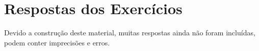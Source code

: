 
\chapter*{Respostas dos Exercícios}

Devido a construção deste material, muitas respostas ainda não foram incluídas, podem conter imprecisões e erros.

\setlength{\columnseprule}{1pt}

\begin{multicols}{2}
\shipoutAnswer
\end{multicols}

\setlength{\columnseprule}{0pt}

